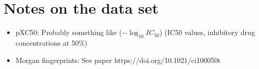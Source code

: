 \documentclass{article}
\begin{document}
\section{Notes on the data set}
\begin{itemize}
    \item pXC50: Probably something like ($-\log_{10}{IC_{50}}$) (IC50 values, inhibitory drug concentrations at 50\%)
    \item Morgan fingerprints: See paper https://doi.org/10.1021/ci100050t
\end{itemize}
\end{document}
